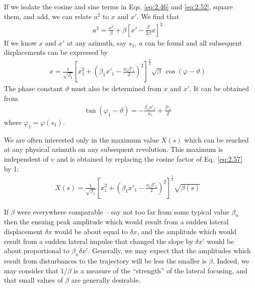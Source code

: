 If we isolate the cosine and sine terms in Eqs. \eqref{eq:2.46} and \eqref{eq:2.52}, square them, and add, we can relate $a^2$ to $x$ and $x'$. We find that
\begin{align}
	a^2 = \frac{x^2}{\beta} + \beta\left[x'-\frac{\beta'}{2\beta}x\right]^2\label{eq:2.56}
\end{align}
If we know $x$ and $x'$ at any azimuth, say $s_1$, $a$ can be found and all subsequent displacements can be expressed by
\begin{align}
	x = \frac{1}{\sqrt{\beta_1}}\left[x_1^2+\left(\beta_1x'_1-\frac{x_1\beta'_1}{2}\right)^2\right]^\frac{1}{2}\sqrt{\beta}\ \cos(\varphi-\vartheta)\label{eq:2.57}
\end{align}
The phase constant $\vartheta$ must also be determined from $x$ and $x'$. It can be obtained from
\begin{align}
	\tan(\varphi_1 - \vartheta) = -\frac{\beta_1 x'_1}{x_1}+\frac{\beta'_1}{2}
\end{align}
where $\varphi_1 = \varphi(s_1)$.

We are often interested only in the maximum value $X(s)$ which can be reached at any physical azimuth on any subsequent revolution. This maximum is independent of $\upsilon$ and is obtained by replacing the cosine factor of Eq.~\eqref{eq:2.57} by 1:
\begin{align}
	X(s) = \frac{1}{\sqrt{\beta_1}}\left[x_1^2+\left(\beta_1x'_1-\frac{x_1\beta'_1}{2}\right)^2\right]^\frac{1}{2}\sqrt{\beta(s)}
\end{align}

If $\beta$ were everywhere comparable -- say not too far from some typical value $\beta_n$ then the ensuing peak amplitude which would result from a sudden lateral displacement $\delta x$ would be about equal to $\delta x$, and the amplitude which would result from a sudden lateral impulse that changed the slope by $\delta x'$ would be about proportional to $\beta_n \delta x'$. Generally, we may expect that the amplitudes which result from disturbances to the trajectory will be less the smaller is $\beta$. Indeed, we may consider that $1/\beta$ is a measure of the “strength” of the lateral focusing, and that small values of $\beta$ are generally desirable.